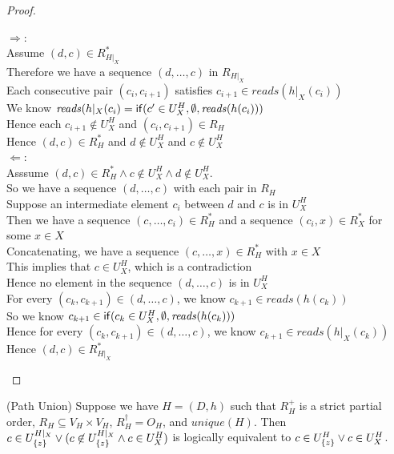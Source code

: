 \begin{proof}

\begin{tabbedproof}
\oo $\Rightarrow$: \\
\ooo Assume $(d,c) \in R^*_{H|_X}$ \\
\ooo Therefore we have a sequence $(d, \ldots, c)$ in $R_{H|_X}$ \\
\ooo Each consecutive pair $(c_i, c_{i+1})$ satisfies $c_{i+1} \in \mathit{reads}(h|_X(c_i))$ \\
\ooo We know $\mathit{reads}(h|_X(c_i) = \mathsf{if}({c' \in U^H_X}, {\emptyset}, {\mathit{reads}(h(c_i))})$ \\
\ooo Hence each $c_{i+1} \not\in U^H_X$ and $(c_i, c_{i+1}) \in R_H$ \\ 
\ooo Hence $(d,c) \in R^*_H$ and $d \not \in U^H_X$ and $c \not \in U^H_X$ \\ 
\oo $\Leftarrow$: \\
\ooo Asssume $(d,c) \in R^*_H \land c \not\in U^H_X \land d \not\in U^H_X$. \\
\ooo So we have a sequence $(d, \ldots, c)$ with each pair in $R_H$ \\
\ooo Suppose an intermediate element $c_i$ between $d$ and $c$ is in $U^H_X$ \\
\oooo Then we have a sequence $(c, \ldots, c_i) \in R^*_H$ and a sequence $(c_i,x) \in R^*_X$ for some $x \in X$ \\ 
\oooo Concatenating, we have a sequence $(c, \ldots, x) \in R^*_H$ with $x \in X$ \\
\oooo This implies that $c \in U^H_X$, which is a contradiction \\
\ooo Hence no element in the sequence $(d, \ldots, c)$ is in $U^H_X$ \\ 
\ooo For every $(c_k, c_{k+1}) \in (d, \ldots, c)$, we know $c_{k+1} \in \mathit{reads}(h(c_k))$ \\
\ooo So we know $c_{k+1} \in \mathsf{if}({c_k \in U^H_X}, {\emptyset}, {\mathit{reads}(h(c_k))})$ \\
\ooo Hence for every $(c_k, c_{k+1}) \in (d, \ldots, c)$, we know $c_{k+1} \in \mathit{reads}(h|_X(c_k))$ \\
\ooo Hence $(d,c) \in R^*_{H|_X}$ \\
\end{tabbedproof}
\end{proof}

\begin{lemma}{(Path Union)}
Suppose we have $H = (D,h)$ such that $R^+_H$ is a strict partial
order, $R_H \subseteq V_H \times V_H$, $R^\dagger_H = O_H$, and
$\mathit{unique}(H)$. Then $c \in U^{H|_{X}}_{\{{z}\}} \vee
(c \not\in U^{H|_{X}}_{\{{z}\}} \land c \in U^H_{X})$
is logically equivalent to $c \in U^H_{\{{z}\}} \vee c \in U^H_{X}$.
\end{lemma}



